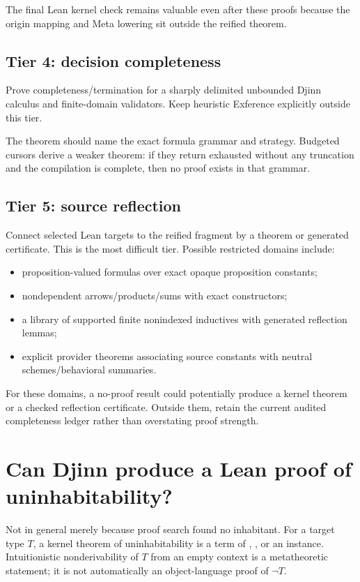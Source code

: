 \documentclass[10pt,letterpaper,oneside]{report}
\newcommand{\code}[1]{\texttt{\detokenize{#1}}}
\begin{document}
The final Lean kernel check remains valuable even after these proofs because the origin mapping and Meta lowering sit outside the reified theorem.

\subsection{Tier 4: decision completeness}

Prove completeness/termination for a sharply delimited unbounded Djinn calculus and finite-domain validators. Keep heuristic Exference explicitly outside this tier.

The theorem should name the exact formula grammar and strategy. Budgeted cursors derive a weaker theorem: if they return exhausted without any truncation and the compilation is complete, then no proof exists in that grammar.

\subsection{Tier 5: source reflection}

Connect selected Lean targets to the reified fragment by a theorem or generated certificate. This is the most difficult tier. Possible restricted domains include:

\begin{itemize}
  \item proposition-valued formulas over exact opaque proposition constants;
  \item nondependent arrows/products/sums with exact constructors;
  \item a library of supported finite nonindexed inductives with generated reflection lemmas;
  \item explicit provider theorems associating source constants with neutral schemes/behavioral summaries.
\end{itemize}

For these domains, a no-proof result could potentially produce a kernel theorem or a checked reflection certificate. Outside them, retain the current audited completeness ledger rather than overstating proof strength.

\section{Can Djinn produce a Lean proof of uninhabitability?}

Not in general merely because proof search found no inhabitant. For a target type \(T\), a kernel theorem of uninhabitability is a term of \code{T -> False}, \code{Not (Nonempty T)}, or an \code{IsEmpty T} instance. Intuitionistic nonderivability of \(T\) from an empty context is a metatheoretic statement; it is not automatically an object-language proof of \(\neg T\).
\end{document}
